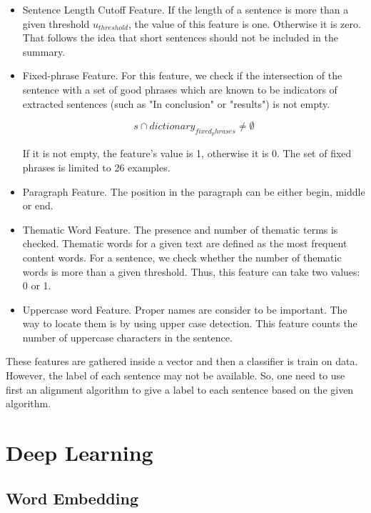 \documentclass[11pt,a4paper,oldfontcommands]{memoir}
\begin{document}
\begin{itemize}

\item Sentence Length Cutoff Feature. If the length of a sentence is more than a given threshold $u_{threshold}$, the value of this feature is one. Otherwise it is zero. That follows the idea that short sentences should not be included in the summary.

\item Fixed-phrase Feature. For this feature, we check if the intersection of the sentence with a set of good phrases which are known to be indicators of extracted sentences (such as "In conclusion" or "results") is not empty.

\[ s \cap dictionary_{fixed_phrases} \neq \emptyset\]

If it is not empty, the feature's value is 1, otherwise it is 0. The set of fixed phrases is limited to 26 examples.

\item Paragraph Feature. The position in the paragraph can be either begin, middle or end.

\item Thematic Word Feature. The presence and number of thematic terms is checked. Thematic words for a given text are defined as the most frequent content words. For a sentence, we check whether the number of thematic words is more than a given threshold. Thus, this feature can take two values: 0 or 1.

\item Uppercase word Feature. Proper names are consider to be important. The way to locate them is by using upper case detection. This feature counts the number of uppercase characters in the sentence.

\end{itemize}

These features are gathered inside a vector and then a classifier is train on data. However, the label of each sentence may not be available. So, one need to use first an alignment algorithm to give a label to each sentence based on the given algorithm.

\section{Deep Learning}

\subsection{Word Embedding}
\end{document}
